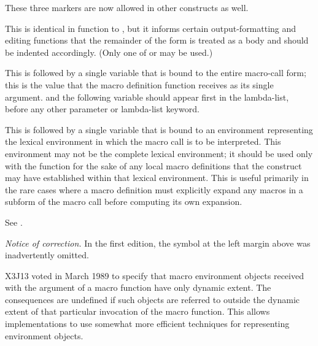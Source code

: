 \begin{defmac}
\begin{new}
These three markers are now allowed in other constructs as well.
\end{new}
\begin{indentdesc}{6pc}
\item[\cd{\&body}]
This is identical in function to , but it informs certain
output-formatting and editing functions that the remainder of the form is
treated as a body and should be indented accordingly.
(Only one of  or  may be used.)

\item[\cd{\&whole}]
This is followed by a single variable that is bound to the
entire macro-call form; this is the value that the macro definition function
receives as its single argument.
 and the following variable should appear first in the lambda-list,
before any other parameter or lambda-list keyword.

\item[\cd{\&environment}]
This is followed by a single variable that is bound
to an environment representing the lexical environment in which the
macro call is to be interpreted.   This environment may not be the
complete lexical environment; it should be used only with
the function  for the sake of any local
macro definitions that the  construct may have
established within that lexical environment.  This is useful primarily
in the rare cases where a macro definition must explicitly expand any macros
in a subform of the macro call before computing its own expansion.
\end{indentdesc}
See .

\begin{new}%
\emph{Notice of correction.}
In the first edition, the symbol  at the
left margin above was inadvertently omitted.
\end{new}

\begin{newer}
X3J13 voted in March 1989 
to specify that macro environment objects received with the 
argument of a macro function
have only dynamic extent.  The consequences are undefined if such objects are
referred to outside the dynamic extent of that particular
invocation of the macro function.
This allows implementations to use somewhat more efficient techniques
for representing environment objects. 
\end{newer}


\end{defmac}
